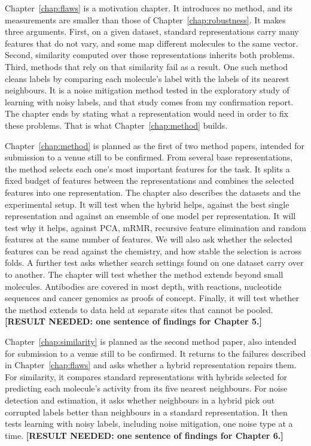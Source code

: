 Chapter~\ref{chap:flaws} is a motivation chapter. It introduces no method, and its measurements are smaller than those of Chapter~\ref{chap:robustness}. It makes three arguments. First, on a given dataset, standard representations carry many features that do not vary, and some map different molecules to the same vector. Second, similarity computed over those representations inherits both problems. Third, methods that rely on that similarity fail as a result. One such method cleans labels by comparing each molecule's label with the labels of its nearest neighbours. It is a noise mitigation method tested in the exploratory study of learning with noisy labels, and that study comes from my confirmation report. The chapter ends by stating what a representation would need in order to fix these problems. That is what Chapter~\ref{chap:method} builds.

Chapter~\ref{chap:method} is planned as the first of two method papers, intended for submission to a venue still to be confirmed. From several base representations, the method selects each one's most important features for the task. It splits a fixed budget of features between the representations and combines the selected features into one representation. The chapter also describes the datasets and the experimental setup. It will test when the hybrid helps, against the best single representation and against an ensemble of one model per representation. It will test why it helps, against PCA, mRMR, recursive feature elimination and random features at the same number of features. We will also ask whether the selected features can be read against the chemistry, and how stable the selection is across folds. A further test asks whether search settings found on one dataset carry over to another. The chapter will test whether the method extends beyond small molecules. Antibodies are covered in most depth, with reactions, nucleotide sequences and cancer genomics as proofs of concept. Finally, it will test whether the method extends to data held at separate sites that cannot be pooled. \textbf{[RESULT NEEDED: one sentence of findings for Chapter 5.]}

Chapter~\ref{chap:similarity} is planned as the second method paper, also intended for submission to a venue still to be confirmed. It returns to the failures described in Chapter~\ref{chap:flaws} and asks whether a hybrid representation repairs them. For similarity, it compares standard representations with hybrids selected for predicting each molecule's activity from its five nearest neighbours. For noise detection and estimation, it asks whether neighbours in a hybrid pick out corrupted labels better than neighbours in a standard representation. It then tests learning with noisy labels, including noise mitigation, one noise type at a time. \textbf{[RESULT NEEDED: one sentence of findings for Chapter 6.]}

